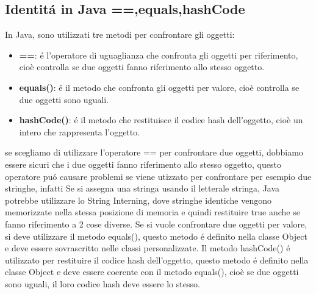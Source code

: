 \documentclass[11pt]{article}
\begin{document}
    \subsection{Identitá in Java ==,equals,hashCode}
    In Java, sono utilizzati tre metodi per confrontare gli oggetti:
    \begin{itemize}
        \item \textbf{==}: é l'operatore di uguaglianza che confronta gli oggetti per riferimento, cioè controlla se due oggetti fanno riferimento allo stesso oggetto.
        \item \textbf{equals()}: é il metodo che confronta gli oggetti per valore, cioè controlla se due oggetti sono uguali.
        \item \textbf{hashCode()}: é il metodo che restituisce il codice hash dell'oggetto, cioè un intero che rappresenta l'oggetto.
        \end{itemize}
    se scegliamo di utilizzare l'operatore == per confrontare due oggetti, dobbiamo essere sicuri che i due oggetti fanno riferimento allo stesso oggetto,
    questo operatore puó causare problemi se viene utizzato per confrontare per esempio due stringhe, infatti
    Se si assegna una stringa usando il letterale stringa, Java potrebbe utilizzare lo String Interning,
    dove stringhe identiche vengono memorizzate nella stessa posizione di memoria e quindi restituire true anche se fanno riferimento a 2 cose diverse.
    \newline
    Se si vuole confrontare due oggetti per valore, si deve utilizzare il metodo equals(), questo metodo é definito nella classe Object e deve essere sovrascritto nelle classi personalizzate.
    \newline
    Il metodo hashCode() é utilizzato per restituire il codice hash dell'oggetto, questo metodo é definito nella classe Object e deve essere coerente con il metodo equals(), cioè se due oggetti sono uguali, il loro codice hash deve essere lo stesso.
\end{document}
